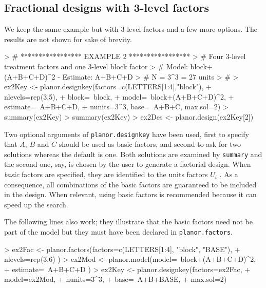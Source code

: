\documentclass[a4paper]{article}
\begin{document}
\subsection{Fractional designs with 3-level factors}
We keep the same example but with 3-level factors and a few
more options. The results are not shown for sake of brevity.

\begin{Schunk}
\begin{Sinput}
> # ***************** EXAMPLE 2 *****************
> # Four 3-level treatment factors and one 3-level block factor
> # Model: block+(A+B+C+D)^2  -   Estimate: A+B+C+D
> # N = 3^3 = 27 units
> #
> ex2Key <- planor.designkey(factors=c(LETTERS[1:4],"block"),
+                            nlevels=rep(3,5),  
+                            block=~block,
+                            model=~block+(A+B+C+D)^2,
+                            estimate=~A+B+C+D,
+                            nunits=3^3, base=~A+B+C, max.sol=2)
> summary(ex2Key)
> summary(ex2Key)
> ex2Des <- planor.design(ex2Key[2])
\end{Sinput}
\end{Schunk}

Two optional arguments of \texttt{planor.designkey} have been used,
first to specify that $A$, $B$ and $C$ should be used as basic
factors, and second to ask for two solutions whereas the default is
one. Both solutions are examined by \texttt{summary} and the second
one, say, is chosen by the user to generate a factorial design. When
\emph{basic} factors are specified, they are identified to the units
factors $U_i$ \cite{kobi05}. As a consequence, all combinations of the
basic factors are guaranteed to be included in the design. When
relevant, using basic factors is recommended because it can speed up
the search.

The following lines also work; they illustrate that the basic factors
need not be part of the model but they must have been declared in
\texttt{planor.factors}.
\begin{Schunk}
\begin{Sinput}
> ex2Fac <- planor.factors(factors=c(LETTERS[1:4], "block", "BASE"),
+                          nlevels=rep(3,6) )
> ex2Mod <- planor.model(model=~block+(A+B+C+D)^2, 
+                        estimate=~A+B+C+D )
> ex2Key <- planor.designkey(factors=ex2Fac, 
+                            model=ex2Mod, 
+                            nunits=3^3,
+                            base=~A+B+BASE, 
+                            max.sol=2)
\end{Sinput}
\end{Schunk}
\end{document}
